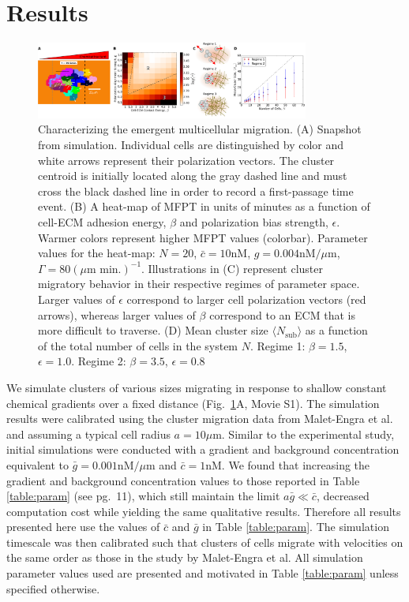 \section{Results}


\begin{figure}[ht]
    \centering
        \includegraphics[width=0.8\textwidth]{../fig/ch2_fig2.png}
    \caption{Characterizing the emergent multicellular migration. (A) Snapshot from simulation. Individual cells are distinguished by color and white arrows represent their polarization vectors. The cluster centroid is initially located along the gray dashed line and must cross the black dashed line in order to record a first-passage time event. (B) A heat-map of MFPT in units of minutes as a function of cell-ECM adhesion energy, $\beta$ and polarization bias strength, $\epsilon$. Warmer colors represent higher MFPT values (colorbar). Parameter values for the heat-map: $N = 20$, $\bar{c} = 10\text{nM}$, $g = 0.004\text{nM}/\mu\text{m}$, $\Gamma = 80 (\mu\text{m min.})^{-1}$. Illustrations in (C) represent cluster migratory behavior in their respective regimes of parameter space. Larger values of $\epsilon$ correspond to larger cell polarization vectors (red arrows), whereas larger values of $\beta$ correspond to an ECM that is more difficult to traverse. (D) Mean cluster size
    $\langle N_\text{sub} \rangle$
    as a function of the total number of cells in the system $N$. Regime 1: $\beta = 1.5$, $\epsilon = 1.0$. Regime 2: $\beta = 3.5$, $\epsilon = 0.8$} \label{fig:heat}
\end{figure}


We simulate clusters of various sizes migrating in response to shallow constant chemical gradients over a fixed distance (Fig.\ \ref{fig:heat}A, Movie S1). The simulation results were calibrated using the cluster migration data from Malet-Engra et al.\ \cite{malet2015collective} and assuming a typical cell radius $a = 10 \mu\text{m}$. Similar to the experimental study, initial simulations were conducted with a gradient and background concentration equivalent to $\bar{g} = 0.001 \text{nM}/\mu\text{m}$ and $\bar{c} = 1 \text{nM}$. We found that increasing the gradient and background concentration values to those reported in Table \ref{table:param} (see pg.\ 11), which still maintain the limit
$a\bar{g} \ll \bar{c}$,
decreased computation cost while yielding the same qualitative results. Therefore all results presented here use the values of $\bar{c}$ and $\bar{g}$ in Table \ref{table:param}. The simulation timescale was then calibrated such that clusters of cells migrate with velocities on the same order as those in the study by Malet-Engra et al. All simulation parameter values used are presented and motivated in Table \ref{table:param} unless specified otherwise.

